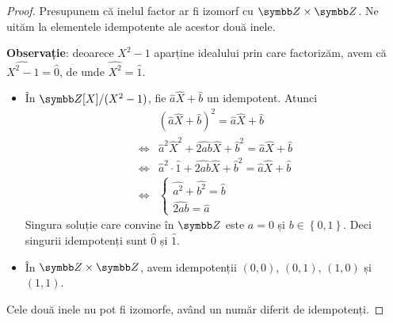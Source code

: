 \begin{exercise}[5.4]
\begin{itemize}
\begin{proof}
    Presupunem că inelul factor ar fi izomorf cu \(\integers \times \integers\). Ne uităm la elementele idempotente ale acestor două inele.
    
    \textbf{Observație}: deoarece \(X^2 - 1\) aparține idealului prin care factorizăm, avem că \(\widehat{X^2 - 1} = \widehat{0}\), de unde \(\widehat{X^2} = \widehat{1}\).
    \begin{itemize}
        \item În \(\integers[X] / (X^2 - 1)\), fie \(\widehat{a}\widehat{X} + \widehat{b}\) un idempotent. Atunci
        \begin{align*}
            & (\widehat{a}\widehat{X} + \widehat{b})^2 = \widehat{a}\widehat{X} + \widehat{b} \\
            \iff & \widehat{a}^2 \widehat{X}^2 + \widehat{2ab}\widehat{X} + \widehat{b}^2 = \widehat{a}\widehat{X} + \widehat{b} \\
            \iff & \widehat{a}^2 \cdot \widehat{1} + \widehat{2ab} \widehat{X} + \widehat{b}^2 = \widehat{a} \widehat{X} + \widehat{b} \\
            \iff &\begin{cases}
                \widehat{a^2} + \widehat{b^2} = \widehat{b} \\
                \widehat{2ab} = \widehat{a}
            \end{cases}
        \end{align*}
        Singura soluție care convine în \(\integers\) este \(a = 0\) și \(b \in \left\lbrace 0, 1 \right\rbrace\). Deci singurii idempotenți sunt \(\widehat{0}\) și \(\widehat{1}\).
        \item În \(\integers \times \integers\), avem idempotenții \((0, 0)\), \((0, 1)\), \((1, 0)\) și \((1, 1)\).
    \end{itemize}
    Cele două inele nu pot fi izomorfe, având un număr diferit de idempotenți.
    \end{proof}
\end{itemize}
\end{exercise}
